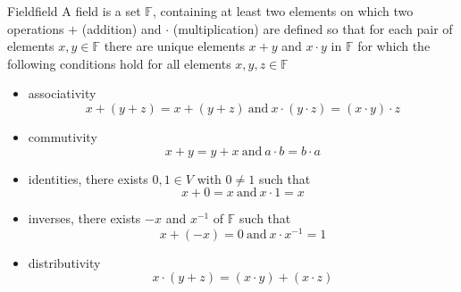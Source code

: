 \begin{definition}
{Field}{field}
A field is a set \(\mathbb{F}\), containing at least two elements on which two
operations \(+\) (addition) and \(\cdot\) (multiplication) are defined so that for
each pair of elements \(x, y \in \mathbb{F}\) there are unique elements \(x + y\)
and \(x \cdot y\) in \(\mathbb{F}\) for which the following conditions hold for all
elements \(x, y, z \in \mathbb{F}\)

\begin{itemize}
  \item associativity
  \[
  x +  \left( y +  z \right)  = x +  \left( y +  z \right)  ~\text{and}~  x
  \cdot \left( y \cdot  z \right) = \left( x \cdot y \right) \cdot z
  \]
  \item commutivity
  \[
  x +  y =  y + x ~\text{and}~ a \cdot b =  b \cdot a 
  \]
  \item identities, there exists \( 0, 1 \in  V \) with \( 0 \neq 1 \) such that
  \[
   x +  0 =  x  ~\text{and}~  x \cdot 1 =  x
  \]
  \item inverses, there exists \( - x \) and \( x ^{  -1 }  \) of \( \mathbb{F}
  \) such that  
  \[
  x +  \left( -  x \right) =  0 ~\text{and}~ x \cdot x ^{ -1 } = 1 
  \]
  \item distributivity
  \[
  x \cdot \left( y +  z \right) =  \left( x \cdot y \right) + \left( x \cdot z \right) 
  \]
\end{itemize}
\end{definition}
